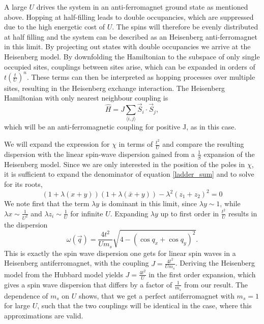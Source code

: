 A large $U$ drives the system in an anti-ferromagnet ground state as mentioned above. 
Hopping at half-filling leads to double occupancies, which are suppressed due to the high energetic cost of $U$. 
The spins will therefore be evenly distributed at half filling and the system can be described as an Heisenberg anti-ferromagnet in this limit.
By projecting out states with double occupancies we arrive at the Heisenberg model.
By downfolding the Hamiltonian to the subspace of only single occupied sites, couplings between sites arise, which can be expanded in orders of 
$t(\frac{t}U)^n$. These terms can then be interpreted as hopping processes over multiple sites, resulting in the Heisenberg exchange interaction.
The Heisenberg Hamiltonian with only nearest neighbour coupling is
\begin{equation}
 \hat H = J \sum_{\langle i,j\rangle} \vec{S}_i \cdot \vec{S}_j,
\end{equation}
which will be an anti-ferromagnetic coupling for positive J, as in this case. 

%
%

We will expand the expression for $\chi$ in terms of $\frac{t^2}{U}$ 
and compare the resulting dispersion with the linear spin-wave dispersion gained from a $\frac1S$ expansion of the Heisenberg model.
Since we are only interested in the position of the poles in $\chi$, it is sufficient to expand the denominator of equation \ref{ladder_sum} and to solve for its roots,
\begin{equation}
 \left(1+\lambda(x+y)\right)\left(1+\lambda(\bar x + y)\right) - \lambda^2(z_1 +z_2)^2 = 0
\end{equation}
We note first that the term $\lambda y$ is dominant in this limit, since $\lambda y \sim 1$, while $\lambda x \sim \frac1{U^2}$ and $\lambda z_i \sim \frac1U$
for infinite $U$.
Expanding $\lambda y$
up to first order in  $\frac{t^2}U$ results in the dispersion
\begin{equation}\label{DispULimit}
 \omega(\vec q) = \frac{4t^2}{Um_s}\sqrt{4-(\cos q_x+\cos q_y)^2}. 
\end{equation}
This is exactly the spin wave dispersion one gets for linear spin waves in a Heisenberg antiferromagnet, 
with the coupling $J=\frac{4t^2}{Um_s}$.
Deriving the Heisenberg model from the Hubbard model yields $J=\frac{4t^2}{U}$ in the first order expansion, 
which gives a spin wave dispersion that differs by a factor of $\frac1{m_s}$ from our result.
The dependence of $m_s$ on $U$ shows, that we get a perfect antiferromagnet with $m_s=1$ for large $U$, 
such that the two couplings will be identical in the case, where this approximations are valid. 
%

